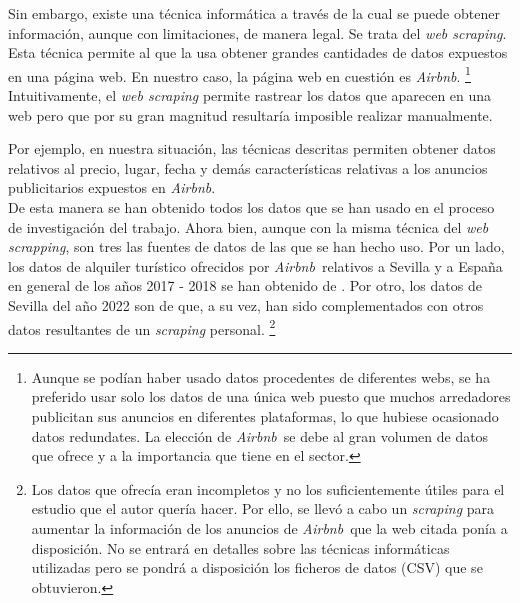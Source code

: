 \documentclass[a4paper,10pt]{article}
\newcommand*{\airbnb}{\textit{Airbnb}}
\newcommand*{\webscrapping}{\textit{web scrapping}}
\begin{document}
\begin{multicols}{2}
            \noindent
            Sin embargo, existe una técnica informática a través de la cual se puede obtener información, aunque con limitaciones, de manera legal.
            Se trata del \textit{web scraping}. Esta técnica permite al que la usa obtener grandes cantidades de datos expuestos en una página web.
            En nuestro caso, la página web en cuestión es \textit{Airbnb}. \footnote{Aunque se podían haber usado datos procedentes de diferentes webs, 
            se ha preferido usar solo los datos de una única web puesto que muchos arredadores publicitan sus anuncios en diferentes plataformas, lo que hubiese 
            ocasionado datos redundates. La elección de \airbnb \ se debe al gran volumen de datos que ofrece y a la importancia que tiene en el sector.} \\
           
            \noindent
            Intuitivamente, el \textit{web scraping} permite rastrear los datos que aparecen 
            en una web pero que por su gran magnitud resultaría imposible realizar manualmente. 
            \vfill\null
            
            \columnbreak
            \noindent
            Por ejemplo, en nuestra situación, las técnicas descritas 
            permiten obtener datos relativos al precio, lugar, fecha y demás características relativas a los anuncios publicitarios expuestos en \airbnb. \\
        
            \noindent
            De esta manera se han obtenido todos los datos que se han usado en el proceso de investigación del trabajo. Ahora bien, aunque con la misma técnica
            del \webscrapping, son tres las fuentes de datos de las que se han hecho uso. Por un lado, los datos de alquiler turístico ofrecidos por 
            \airbnb \  relativos a Sevilla y a España en general de los años 2017 - 2018 se han obtenido de \cite[(1) y (2)]{datahippo}. Por otro, los datos 
            de Sevilla del año 2022 son de \cite[(1)]{insideairbnb} que, a su vez, han sido complementados con otros datos resultantes de un \textit{scraping} personal.
            \footnote{Los datos que ofrecía \cite{insideairbnb} eran incompletos y no los suficientemente útiles para el estudio que el autor quería hacer. Por ello,
            se llevó a cabo un \textit{scraping} para aumentar la información de los anuncios de \airbnb \ que la web citada ponía a disposición. No se 
            entrará en detalles sobre las técnicas informáticas utilizadas pero se pondrá a disposición los ficheros de datos (CSV) que se obtuvieron.} 


\end{multicols}
\end{document}
